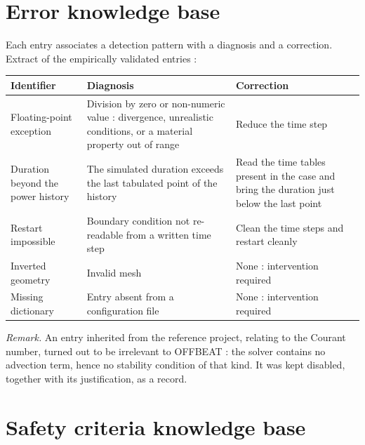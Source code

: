 \section{Error knowledge base}
\label{ann:errkb}

\noindent Each entry associates a detection pattern with a diagnosis and a
correction. Extract of the empirically validated entries :

\vspace{0.3cm}
\noindent
\begin{tabularx}{\textwidth}{@{}>{\raggedright\arraybackslash}p{3.4cm}XX@{}}
\toprule
\textbf{Identifier} & \textbf{Diagnosis} & \textbf{Correction}\\
\midrule
Floating-point exception & Division by zero or non-numeric value : divergence,
  unrealistic conditions, or a material property out of range
  & Reduce the time step\\
Duration beyond the power history & The simulated duration exceeds the last
  tabulated point of the history & Read the time tables present in the case and
  bring the duration just below the last point\\
Restart impossible & Boundary condition not re-readable from a written time
  step & Clean the time steps and restart cleanly\\
Inverted geometry & Invalid mesh & None : intervention required\\
Missing dictionary & Entry absent from a configuration file &
  None : intervention required\\
\bottomrule
\end{tabularx}

\vspace{0.4cm}
\noindent\textit{Remark.} An entry inherited from the reference project,
relating to the Courant number, turned out to be irrelevant to OFFBEAT : the
solver contains no advection term, hence no stability condition of that kind. It
was kept disabled, together with its justification, as a record.

\section{Safety criteria knowledge base}
\label{ann:safetykb}


